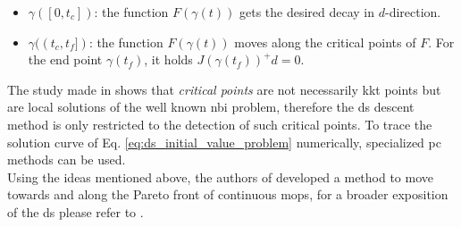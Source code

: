 	\begin{itemize}
		\item $\gamma([0, t_c])$: the function $F(\gamma(t))$ gets the desired decay in $d$-direction.
		\item $\gamma((t_c, t_f])$: the function $F(\gamma(t))$ moves along the critical points of $F$. For the end point $\gamma(t_f)$, it holds $J(\gamma(t_f))^+d = 0$.
	\end{itemize}
	
\begin{comment}	
	
\begin{figure}[H] 
	\centering \def\svgwidth{150pt} 
	 
	\caption{Greedy movement of DS descent} 
	\label{Fig:greedy_ds}
\end{figure}

\end{comment}	
	
The study made in \cite{directed_search} shows that \emph{critical points} are not necessarily \gls{kkt} points but are local solutions of the well known \gls{nbi} \cite{nbi} problem, therefore the \gls{ds} descent method is only restricted to the detection of such critical points. To trace the solution curve of Eq. \eqref{eq:ds_initial_value_problem} numerically, specialized \gls{pc} methods \cite{allgower01} can be used.\\

Using the ideas mentioned above, the authors of \cite{directed_search} developed a method to move towards and along the Pareto front of continuous \glspl{mop}, for a broader exposition of the \gls{ds} please refer to \cite{directed_search}.